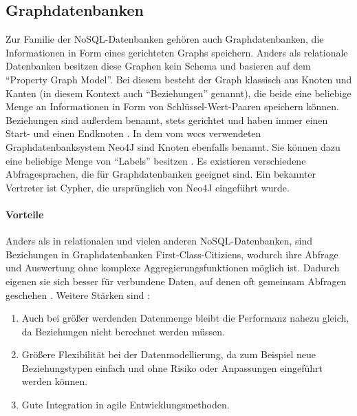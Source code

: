 \subsection{Graphdatenbanken}
    Zur Familie der NoSQL-Datenbanken gehören auch Graphdatenbanken,
    die Informationen in Form eines gerichteten Graphs speichern.
    Anders als relationale Datenbanken besitzen diese Graphen kein Schema
    und basieren auf dem "`Property Graph Model"'.
    Bei diesem besteht der Graph klassisch aus Knoten und Kanten
    (in diesem Kontext auch "`Beziehungen"' genannt),
    die beide eine beliebige Menge an Informationen in Form
    von Schlüssel-Wert-Paaren speichern können.
    Beziehungen sind außerdem benannt, stets gerichtet und haben immer einen
    Start- und einen Endknoten
    \cite[Kapitel 1]{robinson:graphdatabases}.
    In dem vom \gls{wccs} verwendeten Graphdatenbanksystem Neo4J sind Knoten ebenfalls benannt.
    Sie können dazu eine beliebige Menge von "`Labels"' besitzen
    \cite[Kapitel 1.2.1.4]{neo4j:documentation}.
    Es existieren verschiedene Abfragesprachen, die für Graphdatenbanken geeignet sind.
    Ein bekannter Vertreter ist Cypher, die ursprünglich von Neo4J \cite[Kapitel 3]{neo4j:documentation} eingeführt wurde.

    \paragraph{Vorteile}
    Anders als in relationalen und vielen anderen NoSQL-Datenbanken,
    sind Beziehungen in Graphdatenbanken First-Class-Citiziens,
    wodurch ihre Abfrage und Auswertung ohne komplexe Aggregierungsfunktionen möglich ist.
    Dadurch eigenen sie sich besser für verbundene Daten,
    auf denen oft gemeinsam Abfragen geschehen
    \cite[Kapitel 2]{robinson:graphdatabases}
    \cite[Kapitel 11.2]{sadalage:nosql}.
    Weitere Stärken sind
    \cite[Kapitel 1]{robinson:graphdatabases}
    \cite[Kapitel 11.1]{sadalage:nosql}:
    
    \begin{enumerate}
        \item   Auch bei größer werdenden Datenmenge bleibt die Performanz nahezu gleich,
                da Beziehungen nicht berechnet werden müssen.
        \item   Größere Flexibilität bei der Datenmodellierung, da zum Beispiel
                neue Beziehungstypen einfach und ohne Risiko oder Anpassungen eingeführt werden können.
        \item   Gute Integration in agile Entwicklungsmethoden.
    \end{enumerate}
    
